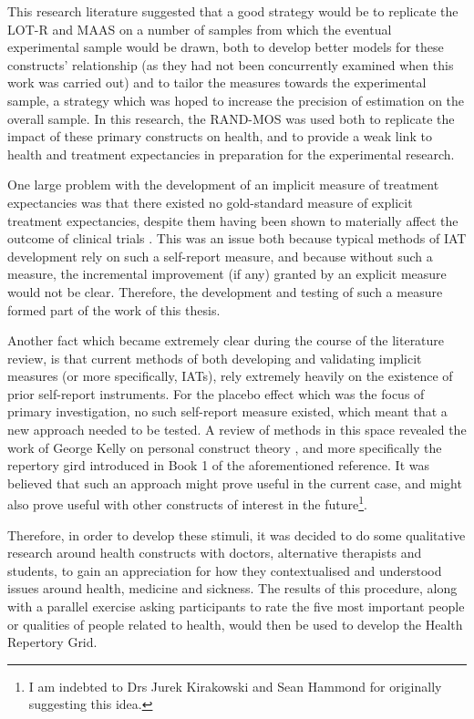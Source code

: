 This research literature suggested that a good strategy would be to
replicate the LOT-R and MAAS on a number of samples from which the
eventual experimental sample would be drawn, both to develop better
models for these constructs' relationship (as they had not been
concurrently examined when this work was carried out) and to tailor
the measures towards the experimental sample, a strategy which was
hoped to increase the precision of estimation on the overall sample.
In this research, the RAND-MOS was used both to replicate the impact
of these primary constructs on health, and to provide a weak link to
health and treatment expectancies in preparation for the experimental
research.

One large problem with the development of an implicit measure of
treatment expectancies was that there existed no gold-standard measure
of explicit treatment expectancies, despite them having been shown to
materially affect the outcome of clinical trials
\cite{Linde2007,Bausell2005,Benedetti2005}. This was an issue both
because typical methods of IAT development rely on such a self-report
measure, and because without such a measure, the incremental
improvement (if any) granted by an explicit measure would not be
clear. Therefore, the development and testing of such a measure formed
part of the work of this thesis.

Another fact which became extremely clear during the course of the
literature review, is that current methods of both developing and
validating implicit measures (or more specifically, IATs), rely
extremely heavily on the existence of prior self-report instruments.
For the placebo effect which was the focus of primary investigation,
no such self-report measure existed, which meant that a new approach
needed to be tested. A review of methods in this space revealed the
work of George Kelly on personal construct theory \cite{Kelly1991},
and more specifically the repertory gird introduced in Book 1 of the
aforementioned reference. It was believed that such an approach might
prove useful in the current case, and might also prove useful with
other constructs of interest in the future\footnote{I am indebted to
Drs Jurek Kirakowski and Sean Hammond for originally suggesting this
idea.}.

Therefore, in order to develop these stimuli, it was decided to do
some qualitative research around health constructs with doctors,
alternative therapists and students, to gain an appreciation for how
they contextualised and understood issues around health, medicine and
sickness. The results of this procedure, along with a parallel
exercise asking participants to rate the five most important people or
qualities of people related to health, would then be used to develop
the Health Repertory Grid.

